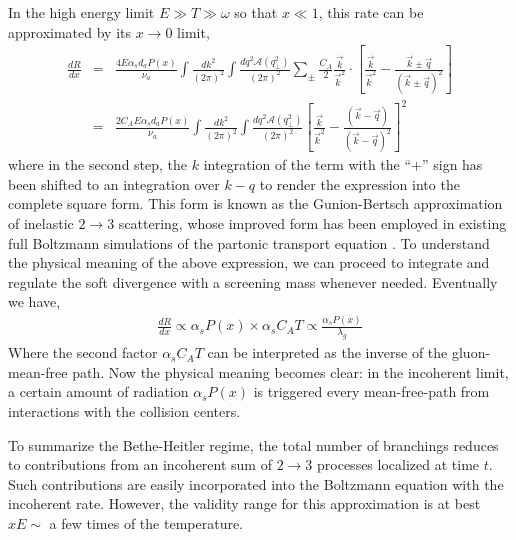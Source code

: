 In the high energy limit $E\gg T \gg \omega$ so that $x\ll 1$, this rate can be approximated by its $x\rightarrow 0$ limit, 
\begin{eqnarray}
\frac{dR}{dx} &=& \frac{4 E\alpha_s d_a P(x)}{\nu_a} \int \frac{dk^2}{(2\pi)^2} \int \frac{dq^2 \mathcal{A}(q_\perp^2)}{(2\pi)^2}  \sum_{\pm}
\frac{C_A}{2} \frac{\vec{k}}{\vec{k}^2}\cdot\left[\frac{\vec{k}}{\vec{k}^2}-\frac{\vec{k}\pm\vec{q}}{(\vec{k}\pm\vec{q})^2}\right] \\
&=& \frac{2 C_A E\alpha_s d_a P(x)}{\nu_a} \int \frac{dk^2}{(2\pi)^2} \int \frac{dq^2 \mathcal{A}(q_\perp^2)}{(2\pi)^2} 
\left[\frac{\vec{k}}{\vec{k}^2}-\frac{(\vec{k}-\vec{q})}{(\vec{k}-\vec{q})^2}\right]^2
\end{eqnarray}
where in the second step, the $k$ integration of the term with the ``$+$'' sign has been shifted to an integration over $k-q$ to render the expression into the complete square form.
This form is known as the Gunion-Bertsch approximation \cite{PhysRevD.25.746} of inelastic $2\rightarrow 3$ scattering, whose improved form \cite{Fochler:2013epa,Uphoff:2014hza} has been employed in existing full Boltzmann simulations of the partonic transport equation \cite{Xu:2004mz,Uphoff:2010sh}.
To understand the physical meaning of the above expression, we can proceed to integrate and regulate the soft divergence with a screening mass whenever needed.
Eventually we have,
\begin{eqnarray}
\frac{dR}{dx} \propto \alpha_s P(x) \times \alpha_s C_A T \propto \frac{\alpha_s P(x)}{\lambda_g}
\label{eq:incoh-dR}
\end{eqnarray}
Where the second factor $\alpha_s C_A T$ can be interpreted as the inverse of the gluon-mean-free path. 
Now the physical meaning becomes clear: in the incoherent limit, a certain amount of radiation $\alpha_s P(x)$ is triggered every mean-free-path from interactions with the collision centers.

To summarize the Bethe-Heitler regime, the total number of branchings reduces to contributions from an incoherent sum of $2\rightarrow 3$ processes localized at time $t$.
Such contributions are easily incorporated into the Boltzmann equation with the incoherent rate.
However, the validity range for this approximation is at best $x E \sim$ a few times of the temperature.


